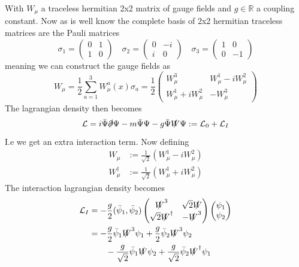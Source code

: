 \documentclass[11pt,a4paper,faculty=we,language=en,doctype=report]{cls/ugent-doc}
\begin{document}
With $W_\mu$ a traceless hermitian 2x2 matrix of gauge fields and $g\in\mathbb{R}$ a coupling constant.
Now as is well know the complete basis of 2x2 hermitian traceless matrices are the Pauli matrices
\begin{equation}
	\sigma_1 = \left(\begin{matrix}0&1\\1&0\end{matrix}\right)\quad \sigma_2 = \left(\begin{matrix}0&-i\\i&0\end{matrix}\right)\quad \sigma_3 = \left(\begin{matrix}1&0\\0&-1\end{matrix}\right)
\end{equation}
meaning we can construct the gauge fields as
\begin{equation}
	W_\mu = \frac{1}{2}\sum^3_{a=1} W_\mu^a(x) \sigma_a = \frac{1}{2}\left(\begin{matrix}W_\mu^3&W_\mu^1-iW_\mu^2\\W_\mu^1+iW_\mu^2&-W_\mu^3\end{matrix}\right)
\end{equation}
The lagrangian density then becomes
\begin{equation}
	\mathcal{L} = i\bar{\Psi}\slashed{\partial}\Psi - m\bar{\Psi}\Psi - g\bar{\Psi}\slashed{W}\Psi := \mathcal{L}_0 + \mathcal{L}_I
\end{equation}
I.e we get an extra interaction term.
Now defining 
\begin{align}
	W_\mu &:= \frac{1}{\sqrt{2}}(W_\mu^1 - iW_\mu^2)\\
	W_\mu^\dagger &:= \frac{1}{\sqrt{2}}(W_\mu^1 + iW_\mu^2)
\end{align}
The interaction lagrangian density becomes 
\begin{align}
	\mathcal{L}_I &= -\frac{g}{2}(\bar{\psi}_1,\bar{\psi}_2)\left(\begin{matrix}\slashed{W}^3&\sqrt{2}\slashed{W}\\\sqrt{2}\slashed{W}^\dagger&-\slashed{W}^3\end{matrix}\right)\left(\begin{matrix}\psi_1\\\psi_2\end{matrix}\right)\\
		      &= -\frac{g}{2}\bar{\psi}_1\slashed{W}^3\psi_1 + \frac{g}{2}\bar{\psi}_2\slashed{W}^3\psi_2\\
		      &\qquad-\frac{g}{\sqrt{2}}\bar{\psi}_1\slashed{W}\psi_2 + \frac{g}{\sqrt{2}}\bar{\psi}_2\slashed{W}^\dagger\psi_1
\end{align}
\end{document}
